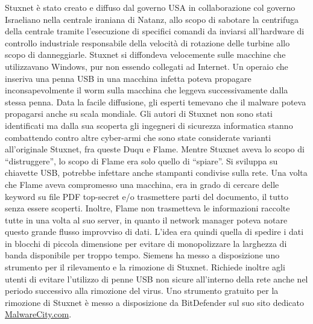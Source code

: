 Stuxnet è stato creato e diffuso dal governo USA in collaborazione col governo Israeliano nella centrale iraniana di Natanz, allo scopo di sabotare la centrifuga della centrale tramite l'esecuzione di specifici comandi da inviarsi all'hardware di controllo industriale responsabile della velocità di rotazione delle turbine allo scopo di danneggiarle. Stuxnet si diffondeva velocemente sulle macchine che utilizzavano Windows, pur non essendo collegati ad Internet. Un operaio che inseriva una penna USB in una macchina infetta poteva propagare inconsapevolmente il worm sulla macchina che leggeva successivamente dalla stessa penna. Data la facile diffusione, gli esperti temevano che il malware poteva propagarsi anche su scala mondiale. Gli autori di Stuxnet non sono stati identificati ma dalla sua scoperta gli ingegneri di sicurezza informatica stanno combattendo contro altre cyber-armi che sono state considerate varianti all'originale Stuxnet, fra queste Duqu e Flame.%
Mentre Stuxnet aveva lo scopo di ``distruggere'', lo scopo di Flame era solo quello di ``spiare''. Si sviluppa su chiavette USB, potrebbe infettare anche stampanti condivise sulla rete. Una volta che Flame aveva compromesso una macchina, era in grado di cercare delle keyword su file PDF top-secret e/o trasmettere parti del documento, il tutto senza essere scoperti. Inoltre, Flame non trasmetteva le informazioni raccolte tutte in una volta al suo server, in quanto il network manager poteva notare questo grande flusso improvviso di dati. L'idea era quindi quella di spedire i dati in blocchi di piccola dimensione per evitare di monopolizzare la larghezza di banda disponibile per troppo tempo. Siemens ha messo a disposizione uno strumento per il rilevamento e la rimozione di Stuxnet. Richiede inoltre agli utenti di evitare l'utilizzo di penne USB non sicure all'interno della rete anche nel periodo successivo alla rimozione del virus. Uno strumento gratuito per la rimozione di Stuxnet è messo a disposizione da BitDefender sul suo sito dedicato \url{MalwareCity.com}.


